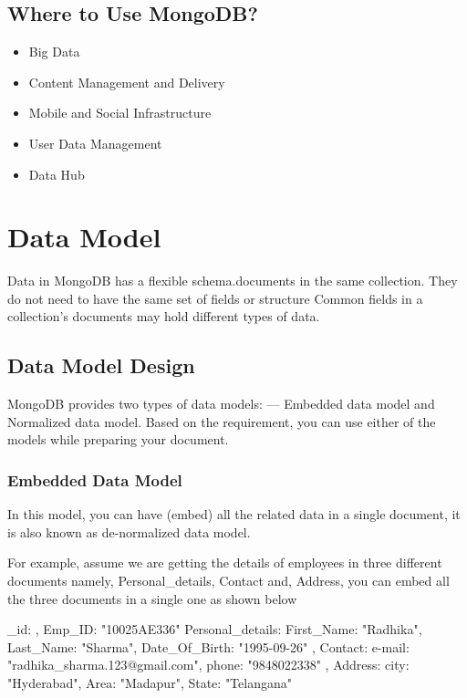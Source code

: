\documentclass[12pt]{article}
\begin{document}
\subsection{Where to Use MongoDB?}

\begin{itemize}
  \item Big Data
  \item Content Management and Delivery
  \item Mobile and Social Infrastructure
  \item User Data Management
  \item Data Hub
\end{itemize}

\newpage
\section{Data Model}

Data in MongoDB has a flexible schema.documents in the same collection.
They do not need to have the same set of fields or structure Common
fields in a collection’s documents may hold different types of data.

\subsection{Data Model Design}

MongoDB provides two types of data models: — Embedded data model and
Normalized data model. Based on the requirement, you can use either of
the models while preparing your document.

\subsubsection{Embedded Data Model}

In this model, you can have (embed) all the related data in a single
document, it is also known as de-normalized data model.

For example, assume we are getting the details of employees in three
different documents namely, Personal\_details, Contact and, Address, you
can embed all the three documents in a single one as shown below

\begin{javascriptcode}
{
    _id: ,
    Emp_ID: "10025AE336"
    Personal_details:{
        First_Name: "Radhika",
        Last_Name: "Sharma",
        Date_Of_Birth: "1995-09-26"
    },
    Contact: {
        e-mail: "radhika_sharma.123@gmail.com",
        phone: "9848022338"
    },
    Address: {
        city: "Hyderabad",
        Area: "Madapur",
        State: "Telangana"
    }
}
\end{javascriptcode}
\end{document}
